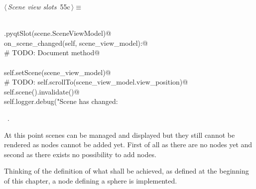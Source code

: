 \documentclass[
    a4paper,      %
    10pt,         %
    openright,    %
    notitlepage,  %
    parskip=half, %
]{scrreprt}       %
\theoremstyle{definition}                    %
\begin{document}
\begin{flushleft} \small
\begin{minipage}{\linewidth}\label{scrap89}\raggedright\small
{} $\langle\,${\itshape Scene view slots}\nobreak\ {\footnotesize {55c}}$\,\rangle\equiv$
\vspace{-1exm}
\begin{list}{}{} \item
\mbox{}\lstinline@@\\
\mbox{}\lstinline@QtCore.pyqtSlot(scene.SceneViewModel)@\\
\mbox{}\lstinline@def on_scene_changed(self, scene_view_model):@\\
\mbox{}\lstinline@    # TODO: Document method@\\
\mbox{}\lstinline@@\\
\mbox{}\lstinline@    self.setScene(scene_view_model)@\\
\mbox{}\lstinline@    # TODO: self.scrollTo(scene_view_model.view_position)@\\
\mbox{}\lstinline@    self.scene().invalidate()@\\
\mbox{}\lstinline@    self.logger.debug("Scene has changed: %s", scene_view_model)@{\NWsep}
\end{list}
\vspace{-1.5ex}
\footnotesize
\begin{list}{}{\setlength{\itemsep}{-\parsep}\setlength{\itemindent}{-\leftmargin}}
\item \NWtxtMacroRefIn\ .

\item{}
\end{list}
\end{minipage}\vspace{4ex}
\end{flushleft}
At this point scenes can be managed and displayed but they still cannot be
rendered as nodes cannot be added yet. First of all as there are no nodes yet
and second as there exists no possibility to add nodes.

Thinking of the definition of what shall be achieved, as defined at the
beginning of this chapter, a node defining a sphere is implemented.
\end{document}

